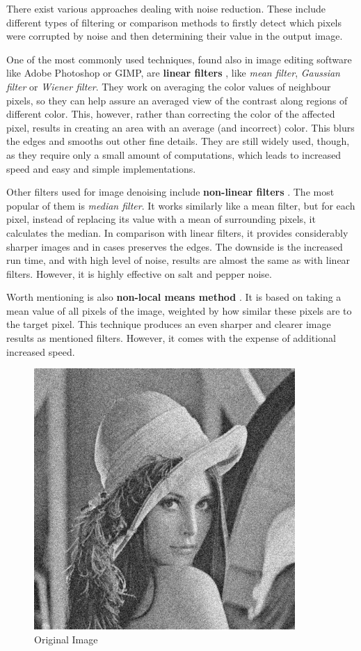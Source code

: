 There exist various approaches dealing with noise reduction. These include different types of filtering or comparison methods to firstly detect which pixels were corrupted by noise and then determining their value in the output image.

\begin{description}

\item One of the most commonly used techniques, found also in image editing software like Adobe Photoshop or GIMP, are \textbf{linear filters} \citep{denoisingTechniques}, like \emph{mean filter}, \emph{Gaussian filter} or \emph{Wiener filter}. They work on averaging the color values of neighbour pixels, so they can help assure an averaged view of the contrast along regions of different color. This, however, rather than correcting the color of the affected pixel, results in creating an area with an average (and incorrect) color. This blurs the edges and smooths out other fine details. They are still widely used, though, as they require only a small amount of computations, which leads to increased speed and easy and simple implementations.

\item Other filters used for image denoising include \textbf{non-linear filters} \citep{denoisingTechniques}. The most popular of them is \emph{median filter}. It works similarly like a mean filter, but for each pixel, instead of replacing its value with a mean of surrounding pixels, it calculates the median. In comparison with linear filters, it provides considerably sharper images and in cases preserves the edges. The downside is the increased run time, and with high level of noise, results are almost the same as with linear filters. However, it is highly effective on salt and pepper noise.

\item Worth mentioning is also \textbf{non-local means method} \citep{nonLocalMeans}. It is based on taking a mean value of all pixels of the image, weighted by how similar these pixels are to the target pixel. This technique produces an even sharper and clearer image results as mentioned filters. However, it comes with the expense of additional increased speed.

\end{description}

\begin{figure}[H]
\centering
\includegraphics[width=0.3\linewidth]{img/denoise_orig.png}
\caption{Original Image} \label{fig:1a}
\end{figure}

